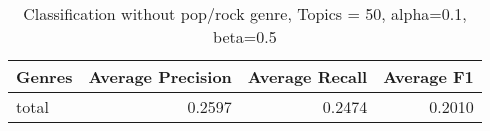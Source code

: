 \begin{table}[h]
\begin{tabular}{|l|r|r|r|}

\hline
\textbf{Genres} &  \textbf{Average Precision} & \textbf{Average Recall} & \textbf{Average F1} \\
\hline
total & 0.2597 & 	0.2474 & 	0.2010\\
\hline
\end{tabular}
\caption{Classification without pop/rock genre, Topics = 50, alpha=0.1, beta=0.5}
\end{table}